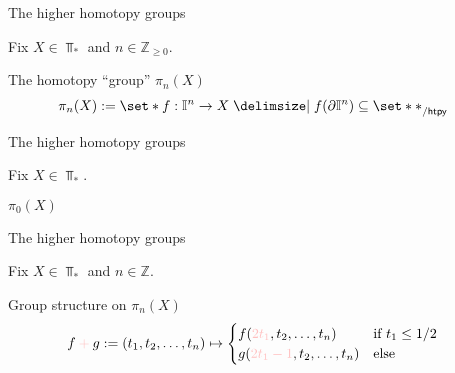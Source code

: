 \begin{frame}[t]{The higher homotopy groups} %

  \par Fix $X \in \Top_{*}$ and $n \in \mathbb{Z}_{\geq 0}$.
  \par{} The homotopy ``group'' $\pi_n (X)$
  \begin{align*}
    \pi_n (X)
    &:= \set*{
      f : \I^n \to X
      \given f (\partial \I^n) \subseteq \set*{*}
    }_{/ \mathsf{htpy}}
  \end{align*}
  
\end{frame}

\begin{frame}[t]{The higher homotopy groups} %

  \par Fix $X \in \Top_{*}$.
  \par{} $\pi_0 (X)$
  
\end{frame}

\begin{frame}[t]{The higher homotopy groups} %

  \par Fix $X \in \Top_{*}$ and $n \in \mathbb{Z}$. 
  \par{} Group structure on $\pi_n (X)$
  \begin{align*}
    f \mathbin{\attentive{+}} g
    &:= (t_1, t_2, \dots, t_n) \mapsto \begin{cases}
      f(\attentive{2 t_1}, t_2, \dots, t_n) & \text{if } t_1 \leq 1/2 \\
      g(\attentive{2 t_1 - 1}, t_2, \dots, t_n) & \text{else}
    \end{cases}
  \end{align*}
  
\end{frame}
